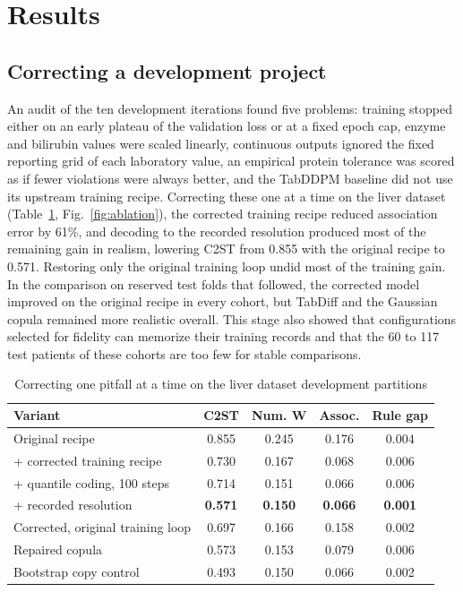 \documentclass[pdflatex,referee]{sn-jnl}%
\begin{document}
\section*{Results}

\subsection*{Correcting a development project}

An audit of the ten development iterations found five problems: training stopped either on an early plateau of the validation loss or at a fixed epoch cap, enzyme and bilirubin values were scaled linearly, continuous outputs ignored the fixed reporting grid of each laboratory value, an empirical protein tolerance was scored as if fewer violations were always better, and the TabDDPM baseline did not use its upstream training recipe. Correcting these one at a time on the liver dataset (Table~\ref{tab:ablation}, Fig.~\ref{fig:ablation}), the corrected training recipe reduced association error by 61\%, and decoding to the recorded resolution produced most of the remaining gain in realism, lowering C2ST from 0.855 with the original recipe to 0.571. Restoring only the original training loop undid most of the training gain. In the comparison on reserved test folds that followed, the corrected model improved on the original recipe in every cohort, but TabDiff and the Gaussian copula remained more realistic overall. This stage also showed that configurations selected for fidelity can memorize their training records and that the 60 to 117 test patients of these cohorts are too few for stable comparisons.

\begin{table}[htbp]
\caption{Correcting one pitfall at a time on the liver dataset development partitions}
\label{tab:ablation}
\centering
\footnotesize
\setlength{\tabcolsep}{4pt}
\begin{tabular}{lcccc}
\toprule
Variant & C2ST & Num. W & Assoc. & Rule gap \\
\midrule
Original recipe & 0.855 & 0.245 & 0.176 & 0.004 \\
+ corrected training recipe & 0.730 & 0.167 & 0.068 & 0.006 \\
+ quantile coding, 100 steps & 0.714 & 0.151 & 0.066 & 0.006 \\
+ recorded resolution & \textbf{0.571} & \textbf{0.150} & \textbf{0.066} & \textbf{0.001} \\
Corrected, original training loop & 0.697 & 0.166 & 0.158 & 0.002 \\
Repaired copula & 0.573 & 0.153 & 0.079 & 0.006 \\
Bootstrap copy control & 0.493 & 0.150 & 0.066 & 0.002 \\
\bottomrule
\end{tabular}
\end{table}
\end{document}
